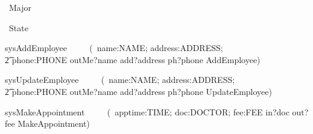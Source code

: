 \documentclass[10pt]{article}
\begin{document}
\begin{circus}
\circprocess\ Major \circdef \circbegin
\end{circus}
\begin{circusaction}
\circstate\ State
\end{circusaction}

\begin{circusaction}
sysAddEmployee ~~\circdef~~ (\circvar\ name:NAME; address:ADDRESS;  \\
    \t2 phone:PHONE \circspot outMe?name add?address ph?phone \lschexpract AddEmployee\rschexpract )  \\ 
\end{circusaction}

\begin{circusaction}
sysUpdateEmployee ~~\circdef~~ (\circvar\ name:NAME; address:ADDRESS;  \\
    \t2 phone:PHONE \circspot outMe?name add?address ph?phone \lschexpract UpdateEmployee\rschexpract )  \\ 
\end{circusaction}

\begin{circusaction}
sysMakeAppointment ~~\circdef~~ (\circvar\ apptime:TIME; doc:DOCTOR; fee:FEE \circspot in?doc out?fee \lschexpract MakeAppointment\rschexpract )  \\ 
\end{circusaction}

\begin{circus}
\circend
\end{circus}
\end{document}
